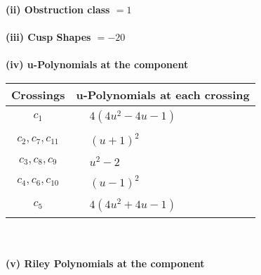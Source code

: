 \documentclass[1p]{elsarticle_modified}
\theoremstyle{definition}
\begin{document}
\flushleft \textbf{(ii) Obstruction class $= 1$}\\~\\
\flushleft \textbf{(iii) Cusp Shapes $= -20$}\\~\\
\newpage\renewcommand{\arraystretch}{1}
\flushleft \textbf{(iv) u-Polynomials at the component}\newline \\
\begin{tabular}{m{50pt}|m{274pt}}
Crossings & \hspace{64pt}u-Polynomials at each crossing \\
\hline $$\begin{aligned}c_{1}\end{aligned}$$&$\begin{aligned}
&4(4 u^2-4 u-1)
\end{aligned}$\\
\hline $$\begin{aligned}c_{2},c_{7},c_{11}\end{aligned}$$&$\begin{aligned}
&(u+1)^2
\end{aligned}$\\
\hline $$\begin{aligned}c_{3},c_{8},c_{9}\end{aligned}$$&$\begin{aligned}
&u^2-2
\end{aligned}$\\
\hline $$\begin{aligned}c_{4},c_{6},c_{10}\end{aligned}$$&$\begin{aligned}
&(u-1)^2
\end{aligned}$\\
\hline $$\begin{aligned}c_{5}\end{aligned}$$&$\begin{aligned}
&4(4 u^2+4 u-1)
\end{aligned}$\\
\hline
\end{tabular}\\~\\
\newpage\renewcommand{\arraystretch}{1}
\flushleft \textbf{(v) Riley Polynomials at the component}\newline \\
\end{document}
